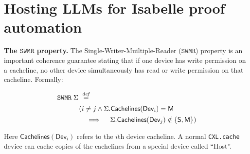\documentclass[10pt,conference]{IEEEtran}
\newcommand\CXLcache{\texttt{CXL.cache}}
\newcommand{\StateSymbol}{\Sigma}
\newcommand\SWMR{\texttt{SWMR}}
\newcommand\const[1]{\textsf{#1}}
\newcommand\Modified{\STATE{M}}
\newcommand\Shared{\STATE{S}}
\newcommand\STATE[1]{\textsf{#1}}
\newcommand\RdOwn{\const{RdOwn}}
\begin{document}

\section{Hosting LLMs for Isabelle proof automation}
\label{sec:llms}

\smallskip\noindent\textbf{The $\SWMR$ property.}
The Single-Writer-Muiltiple-Reader ($\SWMR$) property is an important coherence guarantee stating that
if one device has write permission on a cacheline, no other device simultaneously has read or write permission on that cacheline.
Formally:

\[
\begin{array}{c}
\SWMR\; \StateSymbol\; \dn \hspace{36ex}\\[1ex]
(i \neq j \land \StateSymbol.\textsf{Cachelines}(\textsf{Dev}_i) = \Modified \\[1ex]
\quad \implies \quad \StateSymbol.\textsf{Cachelines}(\textsf{Dev}_j) \notin \{\Shared,\Modified\})\hspace{-8ex}\\[1ex]
\end{array}
\]
\noindent
Here $\textsf{Cachelines}(\textsf{Dev}_i)$ refers to the $i$th device cacheline. A normal \CXLcache{} device can cache copies of the cachelines from a special device called ``Host''.
\end{document}
